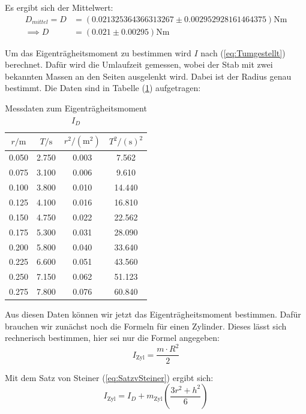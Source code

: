 Es ergibt sich der Mittelwert:
\begin{align*}
  D_{mittel} = D  & = (0.021325364366313267 \pm 0.002952928161464375) \unit{\newton\meter}\\
  \implies D &  = (0.021 \pm 0.00295) \unit{\newton\meter}
\end{align*}

Um das Eigenträgheitsmoment zu bestimmen wird $I$ nach (\ref{eq:Tumgestellt}) berechnet.
Dafür wird die Umlaufzeit gemessen, wobei der Stab mit zwei bekannten Massen an den Seiten ausgelenkt wird.
Dabei ist der Radius genau bestimmt.
Die Daten sind in Tabelle (\ref{tab:Eigenträgheitsmoment}) aufgetragen:

\begin{table}
  \centering
  \caption{Messdaten zum Eigenträgheitsmoment $I_{D}$}
  \label{tab:Eigenträgheitsmoment}
  \begin{tabular}{c c c c}
    \toprule
    $r / \unit\meter$  &  $T / \unit\second$ & $r^2 / (\unit\meter^2)$  & $T^2 / (\unit\second)^2$\\
    \midrule
      0.050   & 2.750   & 0.003   &  7.562  \\
      0.075   & 3.100   & 0.006   &  9.610  \\
      0.100   & 3.800   & 0.010   & 14.440  \\
      0.125   & 4.100   & 0.016   & 16.810  \\
      0.150   & 4.750   & 0.022   & 22.562  \\
      0.175   & 5.300   & 0.031   & 28.090  \\
      0.200   & 5.800   & 0.040   & 33.640  \\
      0.225   & 6.600   & 0.051   & 43.560  \\
      0.250   & 7.150   & 0.062   & 51.123  \\
      0.275   & 7.800   & 0.076   & 60.840  \\
    \bottomrule
    \end{tabular}
\end{table}

Aus diesen Daten können wir jetzt das Eigenträgheitsmoment bestimmen.
Dafür brauchen wir zunächst noch die Formeln für einen Zylinder.
Dieses lässt sich rechnerisch bestimmen, hier sei nur die Formel angegeben:
\begin{equation*}
  I_{\text{Zyl}} = \frac{m \cdot R^2} {2}
\end{equation*}

Mit dem Satz von Steiner (\ref{eq:SatzvSteiner}) ergibt sich:
\begin{equation} \label{eq:IZyl}
  I_{\text{Zyl}} = I_{D} + m_{\text{Zyl}}  \left( \frac{3 r^2 + h^2}{6} \right)
\end{equation}

